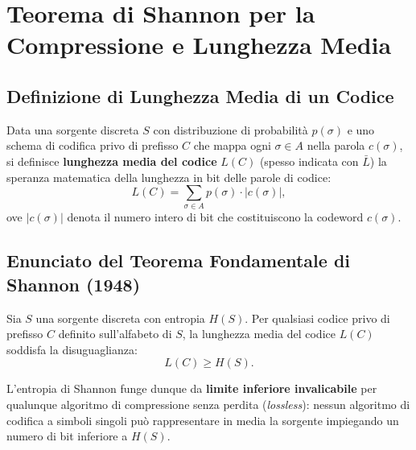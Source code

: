 \FloatBarrier
\section{Teorema di Shannon per la Compressione e Lunghezza Media}
\label{sec:teorema-shannon-compressione}

\FloatBarrier
\subsection{Definizione di Lunghezza Media di un Codice}
\label{subsec:lunghezza-media}

\begin{definition}
Data una sorgente discreta $S$ con distribuzione di probabilit\`a $p(\sigma)$ e uno schema di codifica privo di prefisso $C$ che mappa ogni $\sigma \in A$ nella parola $c(\sigma)$, si definisce \textbf{lunghezza media del codice} $L(C)$ (spesso indicata con $\bar{L}$) la speranza matematica della lunghezza in bit delle parole di codice:
\begin{equation}
  L(C) = \sum_{\sigma \in A} p(\sigma) \cdot |c(\sigma)|,
  \label{eq:lunghezza-media-codice}
\end{equation}
ove $|c(\sigma)|$ denota il numero intero di bit che costituiscono la codeword $c(\sigma)$.
\end{definition}

\FloatBarrier
\subsection{Enunciato del Teorema Fondamentale di Shannon (1948)}
\label{subsec:enunciato-shannon}

\begin{theorem}
Sia $S$ una sorgente discreta con entropia $H(S)$. Per qualsiasi codice privo di prefisso $C$ definito sull'alfabeto di $S$, la lunghezza media del codice $L(C)$ soddisfa la disuguaglianza:
\begin{equation}
  L(C) \ge H(S).
  \label{eq:shannon-source-coding-theorem}
\end{equation}
\end{theorem}

L'entropia di Shannon funge dunque da \textbf{limite inferiore invalicabile} per qualunque algoritmo di compressione senza perdita (\textit{lossless}): nessun algoritmo di codifica a simboli singoli pu\`o rappresentare in media la sorgente impiegando un numero di bit inferiore a $H(S)$.

